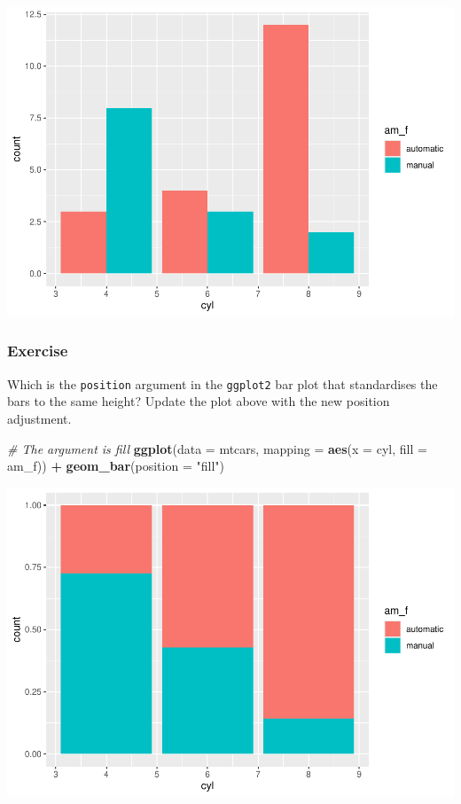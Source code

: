 \documentclass[
]{article}
\newenvironment{Shaded}{\begin{snugshade}}{\end{snugshade}}
\newcommand{\AttributeTok}[1]{\textcolor[rgb]{0.13,0.29,0.53}{#1}}
\newcommand{\CommentTok}[1]{\textcolor[rgb]{0.56,0.35,0.01}{\textit{#1}}}
\newcommand{\FunctionTok}[1]{\textcolor[rgb]{0.13,0.29,0.53}{\textbf{#1}}}
\newcommand{\NormalTok}[1]{#1}
\newcommand{\SpecialCharTok}[1]{\textcolor[rgb]{0.81,0.36,0.00}{\textbf{#1}}}
\newcommand{\StringTok}[1]{\textcolor[rgb]{0.31,0.60,0.02}{#1}}
\begin{document}
\begin{center}\includegraphics{P1_exercises_files/figure-latex/position-bar-ggplot2-1} \end{center}

\subsubsection{\texorpdfstring{ Exercise}{ Exercise}}\label{exercise-1}

Which is the \texttt{position} argument in the \texttt{ggplot2} bar plot
that standardises the bars to the same height? Update the plot above
with the new position adjustment.

\begin{Shaded}
\begin{Highlighting}[]
\CommentTok{\# The argument is fill}
\FunctionTok{ggplot}\NormalTok{(}\AttributeTok{data =}\NormalTok{ mtcars, }\AttributeTok{mapping =} \FunctionTok{aes}\NormalTok{(}\AttributeTok{x =}\NormalTok{ cyl, }\AttributeTok{fill =}\NormalTok{ am\_f)) }\SpecialCharTok{+}
  \FunctionTok{geom\_bar}\NormalTok{(}\AttributeTok{position =} \StringTok{"fill"}\NormalTok{)}
\end{Highlighting}
\end{Shaded}

\begin{center}\includegraphics{P1_exercises_files/figure-latex/positions-ggplot2 answer2.1-1} \end{center}
\end{document}
